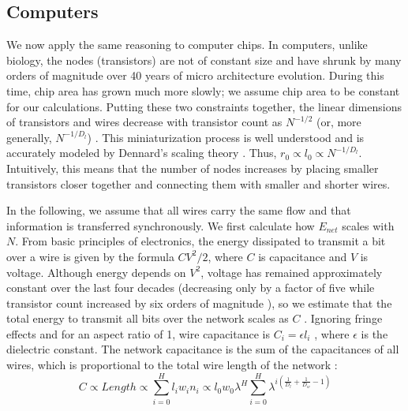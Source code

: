 \documentclass[12pt]{article}
\begin{document}
\subsection{Computers}
\label{sec:computers}

We now apply the same reasoning to computer chips. 
In computers, unlike biology, the nodes (transistors) 
are not of constant size and have shrunk by many orders of magnitude over
40 years of micro architecture evolution.  During this time,
chip area has grown much more slowly; we assume chip area to be constant for our calculations.
Putting these two constraints together, the linear 
dimensions of transistors and wires decrease with transistor count as 
$N^{-1/2}$ (or, more generally, $N^{-1/D_l}$) \cite{moses08}.  This 
miniaturization process is well understood and is accurately modeled 
by Dennard's scaling theory \cite{dennard74}.  
Thus, $r_0 \propto l_0 \propto N^{-1/D_l}$. Intuitively, this means that the number of nodes increases by placing smaller transistors closer together and connecting them with smaller and shorter wires.

In the following, 
we assume that all wires carry the same flow and that information is 
transferred synchronously. We first calculate how $E_{net}$ scales with $N$. From basic principles of electronics, the 
energy dissipated to transmit a bit over a wire is given by the 
formula $CV^2/2$, where $C$ is capacitance and $V$ is voltage.  
Although energy depends on $V^2$, voltage has remained approximately 
constant over the last four decades (decreasing only by a factor of 
five while transistor count increased by six orders of magnitude 
\cite{ning07}), so we estimate that the total energy to transmit all bits over the network scales as $C$ 
\cite{bingham08}.  Ignoring fringe effects and for an aspect ratio of 
1, wire capacitance is $C_i = \epsilon l_i$ \cite{wilhelm95}, where 
$\epsilon$ is the dielectric constant.  The network capacitance is the 
sum of the capacitances of all wires, which is proportional to the 
total wire length of the network \cite{donath79}:
\begin{equation}
C \propto Length \propto  \sum_{i=0}^H l_i w_i n_i \propto
 l_0 w_0 \lambda^H \sum_{i=0}^H \lambda^{i \left( 
\frac{1}{D_l} + \frac{1}{D_w} -1 \right)}
\end{equation}
\end{document}
